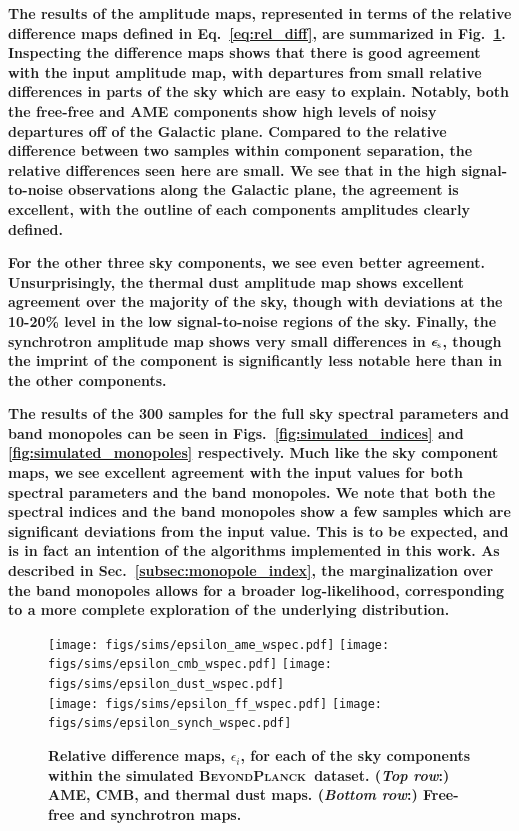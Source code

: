 \documentclass[twocolumn]{aa}
\newcommand{\BP}{\textsc{BeyondPlanck}}
\begin{document}
\textbf{The results of the amplitude maps, represented in terms of the relative difference maps defined in Eq.~\ref{eq:rel_diff}, are summarized in Fig.~\ref{fig:wspec_results}. Inspecting the difference maps shows that there is good agreement with the input amplitude map, with departures from small relative differences in parts of the sky which are easy to explain. Notably, both the free-free and AME components show high levels of noisy departures off of the Galactic plane. Compared to the relative difference between two samples within component separation, the relative differences seen here are small. We see that in the high signal-to-noise observations along the Galactic plane, the agreement is excellent, with the outline of each components amplitudes clearly defined.}

\textbf{For the other three sky components, we see even better agreement. Unsurprisingly, the thermal dust amplitude map shows excellent agreement over the majority of the sky, though with deviations at the 10-20\% level in the low signal-to-noise regions of the sky. Finally, the synchrotron amplitude map shows very small differences in $\epsilon_{\rm s}$, though the imprint of the component is significantly less notable here than in the other components.}

\textbf{The results of the 300 samples for the full sky spectral parameters and band monopoles can be seen in Figs.~\ref{fig:simulated_indices} and \ref{fig:simulated_monopoles} respectively. Much like the sky component maps, we see excellent agreement with the input values for both spectral parameters and the band monopoles. We note that both the spectral indices and the band monopoles show a few samples which are significant deviations from the input value. This is to be expected, and is in fact an intention of the algorithms implemented in this work. As described in Sec.~\ref{subsec:monopole_index}, the marginalization over the band monopoles allows for a broader log-likelihood, corresponding to a more complete exploration of the underlying distribution.
}
\begin{figure}
\centering
\texttt{[image: figs/sims/epsilon\_ame\_wspec.pdf]}
\texttt{[image: figs/sims/epsilon\_cmb\_wspec.pdf]}
\texttt{[image: figs/sims/epsilon\_dust\_wspec.pdf]}\\
\texttt{[image: figs/sims/epsilon\_ff\_wspec.pdf]}
\texttt{[image: figs/sims/epsilon\_synch\_wspec.pdf]}
\caption{\textbf{Relative difference maps, $\epsilon_i$, for each of the sky components within the simulated \BP\ dataset. (\textit{Top row}:) AME, CMB, and thermal dust maps. (\textit{Bottom row}:) Free-free and synchrotron maps.}}
\label{fig:wspec_results}
\end{figure}
\end{document}
